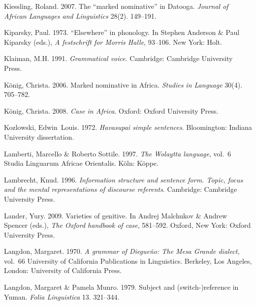 \documentclass[ number=1
			   ,series=sidl
				,url=http://langsci-press.org/catalog/book/18 
			   ,isbn=978-3-944675-19-0
			   ,output=long   %
			  ]{LSP/langsci}
\begin{document}
\begin{thebibliography}{190}
Kiessling, Roland. 2007.
\newblock The ``marked nominative'' in {D}atooga.
\newblock \emph{Journal of African Languages and Linguistics} 28(2). 149--191.

Kiparsky, Paul. 1973.
\newblock ``{E}lsewhere'' in phonology.
\newblock In Stephen Anderson \& Paul Kiparsky (eds.), \emph{A festschrift for
  {M}orris {H}alle}, 93--106. New York: Holt.

Klaiman, M.H. 1991.
\newblock \emph{Grammatical voice}.
\newblock Cambridge: Cambridge University Press.

K{\"o}nig, {\relax Ch}rista. 2006.
\newblock Marked nominative in {A}frica.
\newblock \emph{Studies in Language} 30(4). 705--782.

K{\"o}nig, {\relax Ch}rista. 2008.
\newblock \emph{Case in {A}frica}.
\newblock Oxford: Oxford University Press.

Kozlowski, Edwin~Louis. 1972.
\newblock \emph{{H}avasupai simple sentences}.
\newblock Bloomington: Indiana University dissertation.

Lamberti, Marcello \& Roberto Sottile. 1997.
\newblock \emph{The {W}olaytta language}, vol.~6 Studia Linguarum Africae
  Orientalis.
\newblock K{\"o}ln: K{\"o}ppe.

Lambrecht, Knud. 1996.
\newblock \emph{Information structure and sentence form. {T}opic, focus and the
  mental representations of discourse referents}.
\newblock Cambridge: Cambridge University Press.

Lander, Yury. 2009.
\newblock Varieties of genitive.
\newblock In Andrej Malchukov \& Andrew Spencer (eds.), \emph{The {O}xford
  handbook of case}, 581--592. Oxford, New York: Oxford University Press.

Langdon, Margaret. 1970.
\newblock \emph{A grammar of {D}iegue{\~n}o: {T}he {M}esa {G}rande dialect},
  vol.~66 University of California Publications in Linguistics.
\newblock Berkeley, Los Angeles, London: University of California Press.

Langdon, Margaret \& Pamela Munro. 1979.
\newblock Subject and (switch-)reference in {Y}uman.
\newblock \emph{Folia Linguistica} 13. 321--344.


\end{thebibliography}
\end{document}
